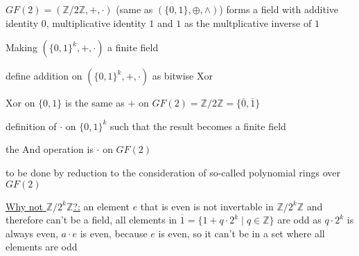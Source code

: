 \documentclass[landscape, a4paper]{article}
\begin{document}
\begin{minipage}[t]{0.198\pagewidth}
\begin{betterlist}
		\item $GF(2) = (\mathbb{Z}/2\mathbb{Z}, +, \cdot)$ (same as $(\{0, 1\}, \oplus, \land)$) forms a field with additive identity $0$, multiplicative identity $1$ and $1$ as the multplicative inverse of $1$
		\item Making $(\{0, 1\}^k, +, \cdot)$ a finite field
		\begin{betterlist}
			\item define addition on $(\{0,1\}^k, +, \cdot)$ as bitwise Xor
			\begin{betterlist}
				\item Xor on $\{0,1\}$ is the same as $+$ on $GF(2) = \mathbb{Z}/2\mathbb{Z} = \{\overline{0}, \overline{1}\}$
			\end{betterlist}
			\item definition of $\cdot$ on $\{0,1\}^k$ such that the result becomes a finite field
			\begin{betterlist}
				\item the And operation is $\cdot$ on $GF(2)$
				\item to be done by reduction to the consideration of so-called polynomial rings over $GF(2)$
			\end{betterlist}
			\item \underline{Why not $\mathbb{Z}/2^k\mathbb{Z}$?:} an element $e$ that is even is not invertable in $\mathbb{Z}/2^k\mathbb{Z}$ and therefore can't be a field, all elements in $\overline{1} = \{1 + q\cdot 2^k \mid q\in \mathbb{Z}\}$ are odd as $q\cdot 2^k$ is always even, $a\cdot e$ is even, because $e$ is even, so it can't be in a set where all elements are odd
		\end{betterlist}
	\end{betterlist}
\end{minipage}
\end{document}

